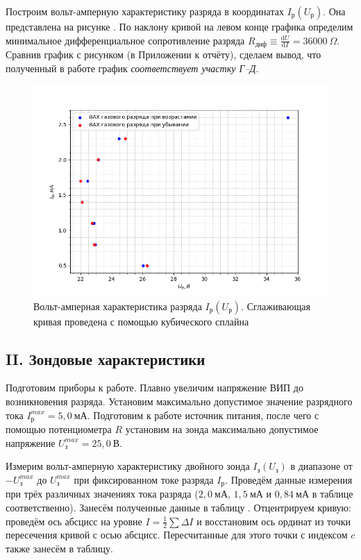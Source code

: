 \documentclass[a4paper,12pt]{article}
\begin{document}
Построим вольт-амперную характеристику разряда в координатах $I_{\text{р}}\left(U_{\text{р}}\right)$. Она представлена на рисунке . По наклону кривой на левом конце графика определим минимальное дифференциальное сопротивление разряда $R_{\text{диф}}\equiv\frac{\text{d}U}{\text{d}I}= 36000 ~\Omega$. Сравнив график с рисунком  (в Приложении к отчёту), сделаем вывод, что полученный в работе график \textit{соответствует участку Г--Д}.

\begin{figure}[h]
	\centering
	\includegraphics[scale=0.9]{8.png}
	\caption{Вольт-амперная характеристика разряда $I_{\text{р}}\left(U_{\text{р}}\right)$. Сглаживающая кривая проведена с помощью кубического сплайна} \label{Zond_VAH}
\end{figure}

\FloatBarrier
\subsection*{II. Зондовые характеристики}

Подготовим приборы к работе. Плавно увеличим напряжение ВИП до возникновения разряда. Установим максимально допустимое значение разрядного тока $I_{\text{р}}^{max}=5,0~\text{мА}$. Подготовим к работе источник питания, после чего с помощью потенциометра $R$ установим на зонда максимально допустимое напряжение $U_{\text{з}}^{max}=25,0~\text{В}$.

Измерим вольт-амперную характеристику двойного зонда $I_{\text{з}}\left(U_{\text{з}}\right)$ в диапазоне от $-U^{max}_{\text{з}}$ до $U^{max}_{\text{з}}$ при фиксированном токе разряда $I_{\text{р}}$. Проведём данные измерения при трёх различных значениях тока разряда ($2,0~\text{мА}$, $1,5~\text{мА}$ и $0,84~\text{мА}$ в таблице соответственно). Занесём полученные данные в таблицу . Отцентрируем кривую: проведём ось абсцисс на уровне $I=\frac{1}{2}\sum\Delta I$ и восстановим ось ординат из точки пересечения кривой с осью абсцисс. Пересчитанные для этого точки с индексом $c$ также занесём в таблицу.
\end{document}
